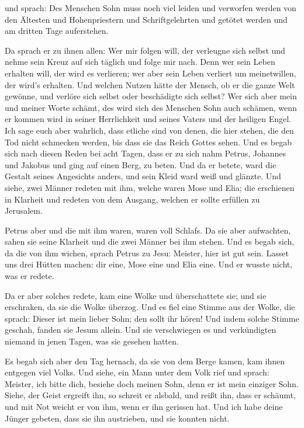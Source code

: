  und sprach: Des Menschen Sohn muss noch viel leiden und
verworfen werden von den Ältesten und Hohenpriestern und
Schriftgelehrten und getötet werden und am dritten Tage auferstehen.

 Da sprach er zu ihnen allen: Wer mir folgen will, der
verleugne sich selbst und nehme sein Kreuz auf sich täglich und folge
mir nach.  Denn wer sein Leben erhalten will, der wird es
verlieren; wer aber sein Leben verliert um meinetwillen, der wird's
erhalten.  Und welchen Nutzen hätte der Mensch, ob er die
ganze Welt gewönne, und verlöre sich selbst oder beschädigte sich
selbst?  Wer sich aber mein und meiner Worte schämt, des
wird sich des Menschen Sohn auch schämen, wenn er kommen wird in seiner
Herrlichkeit und seines Vaters und der heiligen Engel. 
Ich sage euch aber wahrlich, dass etliche sind von denen, die hier
stehen, die den Tod nicht schmecken werden, bis dass sie das Reich
Gottes sehen.  Und es begab sich nach diesen Reden bei
acht Tagen, dass er zu sich nahm Petrus, Johannes und Jakobus und ging
auf einen Berg, zu beten.  Und da er betete, ward die
Gestalt seines Angesichts anders, und sein Kleid ward weiß und glänzte.
 Und siehe, zwei Männer redeten mit ihm, welche waren
Mose und Elia;  die erschienen in Klarheit und redeten
von dem Ausgang, welchen er sollte erfüllen zu Jerusalem.

 Petrus aber und die mit ihm waren, waren voll Schlafs.
Da sie aber aufwachten, sahen sie seine Klarheit und die zwei Männer bei
ihm stehen.  Und es begab sich, da die von ihm wichen,
sprach Petrus zu Jesu: Meister, hier ist gut sein. Lasset uns drei
Hütten machen: dir eine, Mose eine und Elia eine. Und er wusste nicht,
was er redete.

 Da er aber solches redete, kam eine Wolke und
überschattete sie; und sie erschraken, da sie die Wolke überzog.
 Und es fiel eine Stimme aus der Wolke, die sprach:
Dieser ist mein lieber Sohn; den sollt ihr hören!  Und
indem solche Stimme geschah, fanden sie Jesum allein. Und sie
verschwiegen es und verkündigten niemand in jenen Tagen, was sie gesehen
hatten.

 Es begab sich aber den Tag hernach, da sie von dem Berge
kamen, kam ihnen entgegen viel Volks.  Und siehe, ein
Mann unter dem Volk rief und sprach: Meister, ich bitte dich, besiehe
doch meinen Sohn, denn er ist mein einziger Sohn.  Siehe,
der Geist ergreift ihn, so schreit er alsbald, und reißt ihn, dass er
schäumt, und mit Not weicht er von ihm, wenn er ihn gerissen hat.
 Und ich habe deine Jünger gebeten, dass sie ihn
austrieben, und sie konnten nicht.

